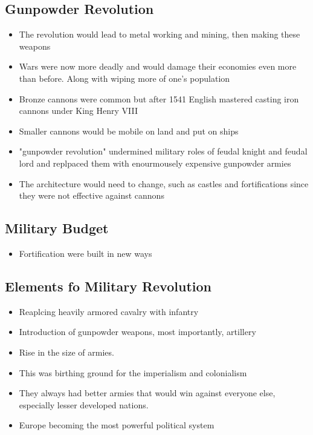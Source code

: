 \documentclass{article}
\begin{document}
\subsection{Gunpowder Revolution}
\begin{itemize}
  \item The revolution would lead to metal working and mining,
    then making these weapons
  \item Wars were now more deadly and would damage their economies even more than before.
    Along with wiping more of one's population
  \item Bronze cannons were common but after 1541 English mastered casting iron cannons
    under King Henry VIII
  \item Smaller cannons would be mobile on land and put on ships
  \item "gunpowder revolution" undermined military roles of feudal knight
    and feudal lord and replpaced them with enourmousely expensive gunpowder armies
  \item The architecture would need to change, such as castles and fortifications
    since they were not effective against cannons
\end{itemize}

\subsection{Military Budget}
\begin{itemize}
  \item Fortification were built in new ways
\end{itemize}

\subsection{Elements fo Military Revolution}
\begin{itemize}
  \item Reaplcing heavily armored cavalry with infantry
  \item Introduction of gunpowder weapons, most importantly, artillery
  \item Rise in the size of armies.
  \item This was birthing ground for the imperialism and colonialism
  \item They always had better armies that would win against
    everyone else, especially lesser developed nations.
  \item Europe becoming the most powerful political system
\end{itemize}
\end{document}
